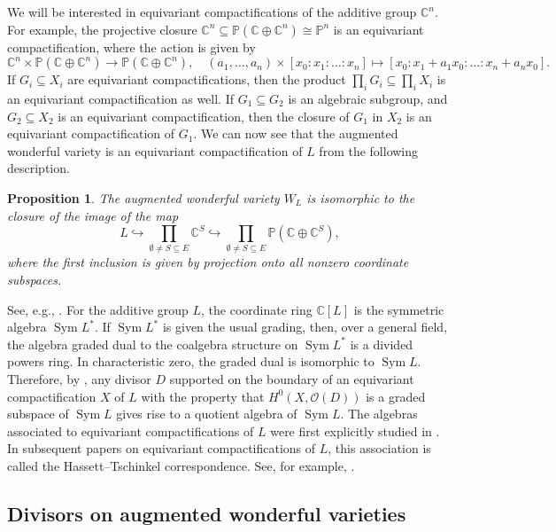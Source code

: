 \documentclass{amsart}
\newtheorem{proposition}[theorem]{Proposition}
\newcommand{\Sym}{\operatorname{Sym}}
\newcommand{\C}{\mathbb{C}}
\renewcommand{\P}{\mathbb{P}}
\theoremstyle{definition}
\begin{document}
We will be interested in 
equivariant compactifications of the additive group $\C^n$. For example, 
the projective closure $\C^n \subseteq \P(\C \oplus \C^n) \cong \P^n$ is 
an equivariant compactification, where the action is given by 
\[
    \C^n \times \P(\C \oplus \C^n) \to \P(\C \oplus \C^n),\quad (a_1, 
    \ldots, a_n) \times [x_0:x_1: \ldots: x_n] \mapsto [x_0:x_1 + 
    a_1x_0: \ldots :x_n + a_nx_0].
\]
If $G_i \subseteq X_i$ are equivariant compactifications, then the 
product $\prod_{i}G_i \subseteq \prod_i X_i$ is an equivariant 
compactification as well. If $G_1 \subseteq G_2$ is an algebraic 
subgroup, and $G_2 \subseteq X_2$ is an equivariant compactification, 
then the closure of $G_1$ in $X_2$ is an equivariant 
compactification of $G_1$. We can now see that the augmented wonderful variety is an 
equivariant compactification of $L$ from the following description.
\begin{proposition}
    The augmented wonderful variety $W_L$ is isomorphic to the closure of the 
    image of the map
    \[
        L \hookrightarrow \prod_{\emptyset \not= S \subseteq E} \C^S \hookrightarrow 
        \prod_{\emptyset \not= S \subseteq E} \P(\C \oplus \C^S),
    \]
    where the first inclusion is given by projection onto all nonzero 
    coordinate subspaces.
\end{proposition}
See, e.g., \cite[Section 3]{LLPP}. 
For the additive group $L$, the coordinate ring $\C[L]$ is 
the symmetric algebra $\Sym L^*$. If $\operatorname{Sym} L^*$ is given the usual grading,  then, over a general field, the algebra graded dual to the coalgebra structure on $\Sym L^*$ is a divided powers ring.
In characteristic 
zero, the graded dual is isomorphic to $\Sym L$. Therefore, by 
, any divisor $D$ supported on the 
boundary of an equivariant compactification $X$ of $L$ with the property that $H^0(X, \mathcal{O}(D))$ is a graded subspace of $\operatorname{Sym} L$ gives rise to a 
quotient algebra of $\Sym L$. The algebras associated to equivariant 
compactifications of $L$ were first explicitly studied in 
\cite{hassettGeometryEquivariantCompactifications1999}. In subsequent 
papers on equivariant compactifications of $L$, this association is 
called the Hassett--Tschinkel correspondence. See, for example, 
\cite{arzhantsevEquivariantCompletionsAffine2022}.

\subsection{Divisors on augmented wonderful varieties}
\end{document}
